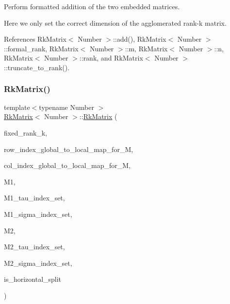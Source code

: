 Perform formatted addition of the two embedded matrices.

Here we only set the correct dimension of the agglomerated rank-\/k matrix.

References Rk\+Matrix$<$ Number $>$\+::add(), Rk\+Matrix$<$ Number $>$\+::formal\+\_\+rank, Rk\+Matrix$<$ Number $>$\+::m, Rk\+Matrix$<$ Number $>$\+::n, Rk\+Matrix$<$ Number $>$\+::rank, and Rk\+Matrix$<$ Number $>$\+::truncate\+\_\+to\+\_\+rank().

\mbox{\label{classRkMatrix_a0ef50f2d8d07bcbffa0a6d015dc0d1a4}} 
\subsubsection{\texorpdfstring{Rk\+Matrix()}{RkMatrix()}\hspace{0.1cm}{\footnotesize\ttfamily [16/19]}}
{\footnotesize\ttfamily template$<$typename Number $>$ \\
\hyperlink{classRkMatrix}{Rk\+Matrix}$<$ Number $>$\+::\hyperlink{classRkMatrix}{Rk\+Matrix} (\begin{DoxyParamCaption}\item[{const \hyperlink{classRkMatrix_add060bfc3a4cc77f858c3d6dd58cadd5}{size\+\_\+type}}]{fixed\+\_\+rank\+\_\+k,  }\item[{const std\+::map$<$ types\+::global\+\_\+dof\+\_\+index, size\+\_\+t $>$ \&}]{row\+\_\+index\+\_\+global\+\_\+to\+\_\+local\+\_\+map\+\_\+for\+\_\+M,  }\item[{const std\+::map$<$ types\+::global\+\_\+dof\+\_\+index, size\+\_\+t $>$ \&}]{col\+\_\+index\+\_\+global\+\_\+to\+\_\+local\+\_\+map\+\_\+for\+\_\+M,  }\item[{const \hyperlink{classRkMatrix}{Rk\+Matrix}$<$ Number $>$ \&}]{M1,  }\item[{const std\+::vector$<$ types\+::global\+\_\+dof\+\_\+index $>$ \&}]{M1\+\_\+tau\+\_\+index\+\_\+set,  }\item[{const std\+::vector$<$ types\+::global\+\_\+dof\+\_\+index $>$ \&}]{M1\+\_\+sigma\+\_\+index\+\_\+set,  }\item[{const \hyperlink{classRkMatrix}{Rk\+Matrix}$<$ Number $>$ \&}]{M2,  }\item[{const std\+::vector$<$ types\+::global\+\_\+dof\+\_\+index $>$ \&}]{M2\+\_\+tau\+\_\+index\+\_\+set,  }\item[{const std\+::vector$<$ types\+::global\+\_\+dof\+\_\+index $>$ \&}]{M2\+\_\+sigma\+\_\+index\+\_\+set,  }\item[{bool}]{is\+\_\+horizontal\+\_\+split }\end{DoxyParamCaption})}


